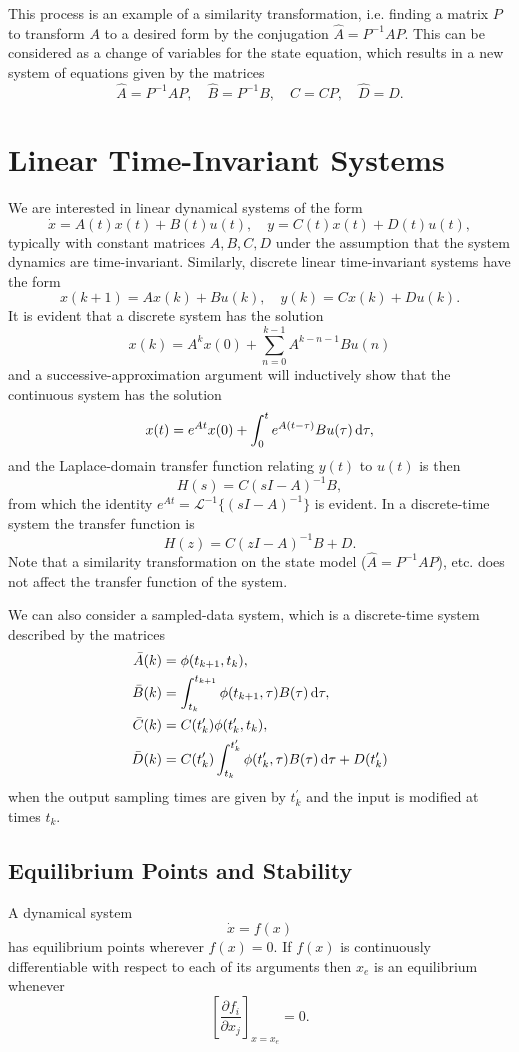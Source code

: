 \documentclass{report}
\begin{document}
This process is an example of a similarity transformation,
i.e. finding a matrix $P$ to transform $A$ to a desired form by the
conjugation $\hat{A} = P^{-1} A P$. This can be considered as a change
of variables for the state equation, which results in a new system of
equations given by the matrices
$$
\hat{A} = P^{-1} A P, \quad
\hat{B} = P^{-1} B, \quad
\hat{C} = C P, \quad
\hat{D} = D.
$$

\section{Linear Time-Invariant Systems}
We are interested in linear dynamical systems of the form
$$
\dot{x} = A(t) x(t) + B(t) u(t), \quad
y = C(t) x(t) + D(t) u(t),
$$
typically with constant matrices $A, B, C, D$ under the assumption
that the system dynamics are time-invariant. Similarly, discrete
linear time-invariant systems have the form
$$
x(k+1) = A x(k) + B u(k), \quad
y(k) = C x(k) + D u(k).
$$
It is evident that a discrete system has the solution
$$
x(k) = A^k x(0) + \sum_{n=0}^{k-1} A^{k-n-1} B u(n)
$$
and a successive-approximation argument will inductively show that the
continuous system has the solution
$$
x(t) = e^{At} x(0) + \int_0^t e^{A(t - \tau)} B u(\tau) \dif \tau,
$$
and the Laplace-domain transfer function relating $y(t)$ to $u(t)$ is then
$$
H(s) = C(sI - A)^{-1} B,
$$
from which the identity $e^{At} = \mathcal{L}^{-1}\{(sI - A)^{-1}\}$
is evident. In a discrete-time system the transfer function is
$$
H(z) = C(zI - A)^{-1} B + D.
$$
Note that a similarity transformation on the state model
($\hat{A} = P^{-1} A P$), etc. does not affect the transfer function of
the system.

We can also consider a sampled-data system, which is a discrete-time
system described by the matrices
\begin{align*}
\bar{A}(k) &= \phi(t_{k+1}, t_k), \\
\bar{B}(k) &=
  \int_{t_k}^{t_{k+1}} \phi(t_{k+1}, \tau) B(\tau) \dif\tau, \\
\bar{C}(k) &= C(t_k^\prime)\phi(t_k^\prime, t_k), \\
\bar{D}(k) &=
  C(t_k^\prime)
  \int_{t_k}^{t_k^\prime} \phi(t_k^\prime, \tau) B(\tau) \dif \tau
+ D(t_k^\prime)
\end{align*}
when the output sampling times are given by $t_k^\prime$ and the input
is modified at times $t_k$.

\subsection{Equilibrium Points and Stability}
A dynamical system
$$
\dot{x} = f(x)
$$
has equilibrium points wherever $f(x) = 0$. If $f(x)$ is continuously
differentiable with respect to each of its arguments then $x_e$ is an
equilibrium whenever
$$
\left[\frac{\partial f_i}{\partial x_j}\right]_{x = x_e} = 0.
$$
\end{document}
